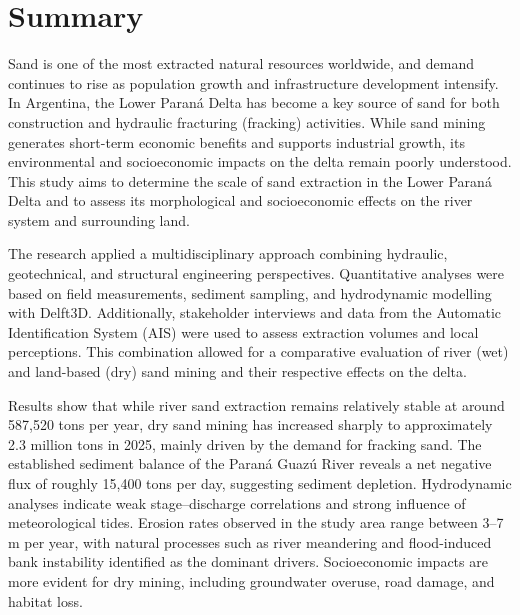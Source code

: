 \chapter*{Summary}
Sand is one of the most extracted natural resources worldwide, and demand continues to rise as population growth and infrastructure development intensify. In Argentina, the Lower Paraná Delta has become a key source of sand for both construction and hydraulic fracturing (fracking) activities. While sand mining generates short-term economic benefits and supports industrial growth, its environmental and socioeconomic impacts on the delta remain poorly understood. This study aims to determine the scale of sand extraction in the Lower Paraná Delta and to assess its morphological and socioeconomic effects on the river system and surrounding land.

The research applied a multidisciplinary approach combining hydraulic, geotechnical, and structural engineering perspectives. Quantitative analyses were based on field measurements, sediment sampling, and hydrodynamic modelling with Delft3D. Additionally, stakeholder interviews and data from the Automatic Identification System (AIS) were used to assess extraction volumes and local perceptions. This combination allowed for a comparative evaluation of river (wet) and land-based (dry) sand mining and their respective effects on the delta.

Results show that while river sand extraction remains relatively stable at around 587,520 tons per year, dry sand mining has increased sharply to approximately 2.3 million tons in 2025, mainly driven by the demand for fracking sand. The established sediment balance of the Paraná Guazú River reveals a net negative flux of roughly 15,400 tons per day, suggesting sediment depletion. Hydrodynamic analyses indicate weak stage–discharge correlations and strong influence of meteorological tides. Erosion rates observed in the study area range between 3–7 m per year, with natural processes such as river meandering and flood-induced bank instability identified as the dominant drivers. Socioeconomic impacts are more evident for dry mining, including groundwater overuse, road damage, and habitat loss.